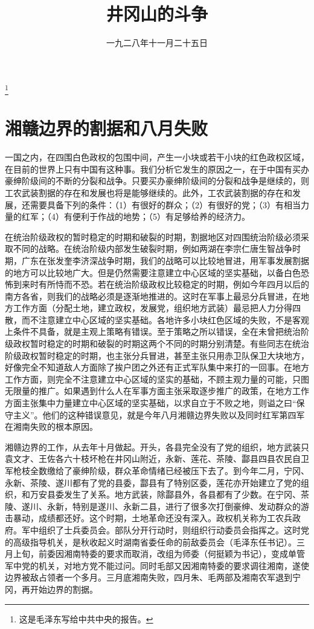 
\title{井冈山的斗争}
\date{一九二八年十一月二十五日}
\thanks{这是毛泽东写给中共中央的报告。}
\maketitle


\section{湘赣边界的割据和八月失败}

一国之内，在四围白色政权的包围中间，产生一小块或若干小块的红色政权区域，在目前的世界上只有中国有这种事。我们分析它发生的原因之一，在于中国有买办豪绅阶级间的不断的分裂和战争。只要买办豪绅阶级间的分裂和战争是继续的，则工农武装割据的存在和发展也将是能够继续的。此外，工农武装割据的存在和发展，还需要具备下列的条件：（1）有很好的群众；（2）有很好的党；（3）有相当力量的红军；（4）有便利于作战的地势；（5）有足够给养的经济力。

在统治阶级政权的暂时稳定的时期和破裂的时期，割据地区对四围统治阶级必须采取不同的战略。在统治阶级内部发生破裂时期，例如两湖在李宗仁唐生智战争时期，广东在张发奎李济深战争时期，我们的战略可以比较地冒进，用军事发展割据的地方可以比较地广大。但是仍然需要注意建立中心区域的坚实基础，以备白色恐怖到来时有所恃而不恐。若在统治阶级政权比较稳定的时期，例如今年四月以后的南方各省，则我们的战略必须是逐渐地推进的。这时在军事上最忌分兵冒进，在地方工作方面（分配土地，建立政权，发展党，组织地方武装）最忌把人力分得四散，而不注意建立中心区域的坚实基础。各地许多小块红色区域的失败，不是客观上条件不具备，就是主观上策略有错误。至于策略之所以错误，全在未曾把统治阶级政权暂时稳定的时期和破裂的时期这两个不同的时期分别清楚。有些同志在统治阶级政权暂时稳定的时期，也主张分兵冒进，甚至主张只用赤卫队保卫大块地方，好像完全不知道敌人方面除了挨户团之外还有正式军队集中来打的一回事。在地方工作方面，则完全不注意建立中心区域的坚实的基础，不顾主观力量的可能，只图无限量的推广。如果遇到什么人在军事方面主张采取逐步推广的政策，在地方工作方面主张集中力量建立中心区域的坚实基础，以求自立于不败之地，则谥之曰“保守主义”。他们的这种错误意见，就是今年八月湘赣边界失败以及同时红军第四军在湘南失败的根本原因。

湘赣边界的工作，从去年十月做起。开头，各县完全没有了党的组织，地方武装只袁文才、王佐各六十枝坏枪在井冈山附近，永新、莲花、茶陵、酃县四县农民自卫军枪枝全数缴给了豪绅阶级，群众革命情绪已经被压下去了。到今年二月，宁冈、永新、茶陵、遂川都有了党的县委，酃县有了特别区委，莲花亦开始建立了党的组织，和万安县委发生了关系。地方武装，除酃县外，各县都有了少数。在宁冈、茶陵、遂川、永新，特别是遂川、永新二县，进行了很多次打倒豪绅、发动群众的游击暴动，成绩都还好。这个时期，土地革命还没有深入。政权机关称为工农兵政府。军中组织了士兵委员会。部队分开行动时，则组织行动委员会指挥之。这时党的高级指导机关，是秋收起义时湖南省委任命的前敌委员会（毛泽东任书记）。三月上旬，前委因湘南特委的要求而取消，改组为师委（何挺颖为书记），变成单管军中党的机关，对地方党不能过问。同时毛部又因湘南特委的要求调往湘南，遂使边界被敌占领者一个多月。三月底湘南失败，四月朱、毛两部及湘南农军退到宁冈，再开始边界的割据。

